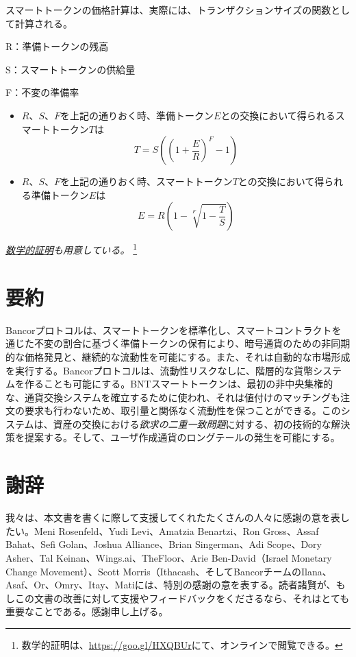 \documentclass{jsarticle}
\begin{document}
スマートトークンの価格計算は、実際には、トランザクションサイズの関数として計算される。

R：準備トークンの残高

S：スマートトークンの供給量

F：不変の準備率

\begin{itemize}
  \item $R$、$S$、$F$を上記の通りおく時、準備トークン$E$との交換において得られるスマートトークン$T$は
  \begin{equation*} \label{eq:price-discovery-formula}
    T = S((1 + \frac{E}{R})^F - 1)
  \end{equation*}

  \item $R$、$S$、$F$を上記の通りおく時、スマートトークン$T$との交換において得られる準備トークン$E$は
  \begin{equation*} \label{eq:price-discovery-formula}
    E = R(1 - \sqrt[F]{1 - \frac{T}{S}})
  \end{equation*}
\end{itemize}

\emph{\href{https://goo.gl/HXQBUr}{数学的証明}も用意している。}
\footnote{
  数学的証明は、\url{https://goo.gl/HXQBUr}にて、オンラインで閲覧できる。
}

\section{要約}

Bancorプロトコルは、スマートトークンを標準化し、スマートコントラクトを通じた不変の割合に基づく準備トークンの保有により、暗号通貨のための非同期的な価格発見と、継続的な流動性を可能にする。また、それは自動的な市場形成を実行する。Bancorプロトコルは、流動性リスクなしに、階層的な貨幣システムを作ることも可能にする。BNTスマートトークンは、最初の非中央集権的な、通貨交換システムを確立するために使われ、それは値付けのマッチングも注文の要求も行わないため、取引量と関係なく流動性を保つことができる。このシステムは、資産の交換における\emph{欲求の二重一致問題}に対する、初の技術的な解決策を提案する。そして、ユーザ作成通貨のロングテールの発生を可能にする。

\section{謝辞}

我々は、本文書を書くに際して支援してくれたたくさんの人々に感謝の意を表したい。Meni Rosenfeld、Yudi Levi、Amatzia Benartzi、Ron Gross、Assaf Bahat、Sefi Golan、Joshua Alliance、Brian Singerman、Adi Scope、Dory Asher、Tal Keinan、Wings.ai、TheFloor、Arie Ben-David（Israel Monetary Change Movement）、Scott Morris（Ithacash、そしてBancorチームのIlana、Asaf、Or、Omry、Itay、Matiには、特別の感謝の意を表する。読者諸賢が、もしこの文書の改善に対して支援やフィードバックをくださるなら、それはとても重要なことである。感謝申し上げる。
\end{document}

